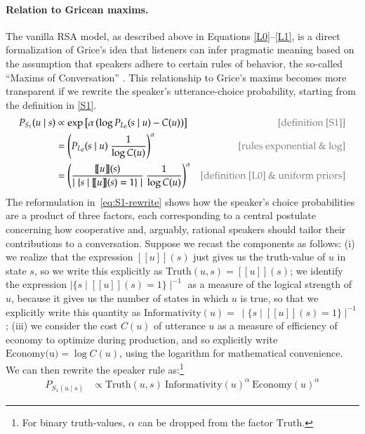 \documentclass{sp}
\newcommand{\sem}[1]{\ensuremath{[\![#1]\!]}}
\begin{document}
\paragraph{Relation to Gricean maxims.} The vanilla RSA model, as described above in Equations
\eqref{L0}--\eqref{L1}, is a direct formalization of Grice's idea that listeners can infer
pragmatic meaning based on the assumption that speakers adhere to certain rules of behavior,
the so-called ``Maxims of Conversation'' \citep{Grice1975:Logic-and-Conve}. This relationship to Grice's maxims becomes more
transparent if we rewrite the speaker's utterance-choice probability, starting from the
definition in \eqref{S1}.
%
\begin{align} \label{eq:S1-rewrite}
  P_{S_1}(u\mid s) & \propto \exp \left [ \alpha \left (\log P_{L_0}(s \mid u) - C(u) \right)  \right ] & \text{\textcolor{gray}{[definition \eqref{S1}]}} \\
  & = \left (P_{L_0}(s \mid u) \  \frac{1}{\log C(u)} \right)^{\alpha} & \text{\textcolor{gray}{[rules exponential \& log]}} \nonumber \\
  & = \left ( \frac{\sem{u}(s)}{\mid  \{s \mid \sem{u}(s)=1\} \mid } \ \frac{1}{\log C(u)} \right )^{\alpha} & \text{\textcolor{gray}{[definition \eqref{L0} \& uniform priors]}} \nonumber
\end{align}
%
The reformulation in~\eqref{eq:S1-rewrite} shows how the speaker's choice probabilities are a
product of three factors, each corresponding to a central postulate concerning how cooperative and, arguably, rational speakers should tailor their contributions
to a conversation. Suppose we recast the components as follows: (i) we realize that the expression $\sem{u}(s)$ just gives us the truth-value of $u$ in state $s$, so we write this explicitly as 
$\text{Truth}(u,s) = \sem{u}(s)$; we identify the expression $\mid \{s \mid \sem{u}(s)=1\} \mid ^{-1}$ as a measure of the logical strength of $u$, because it gives us the number of states in which $u$ is true, so that we explicitly write this quantity as  $\text{Informativity}(u) =\  \mid \{s \mid \sem{u}(s)=1\} \mid ^{-1}$; (iii) we consider the cost $C(u)$ of utterance $u$ as a measure of efficiency of economy to optimize during production, and so explicitly write $\text{Economy(u)} = \log C(u)$, using the logarithm for mathematical convenience. We can then rewrite the speaker rule as:\footnote{For
binary truth-values, $\alpha$ can be dropped from the factor $\text{Truth}$.}
\begin{align} \label{eq:S1-three-factor-formulation}
  P_{S_1(u\mid s)}   & \propto \text{Truth}(u,s) \ \text{Informativity}(u)^{\alpha} \ \text{Economy}(u)^{\alpha} 
\end{align}
\end{document}
